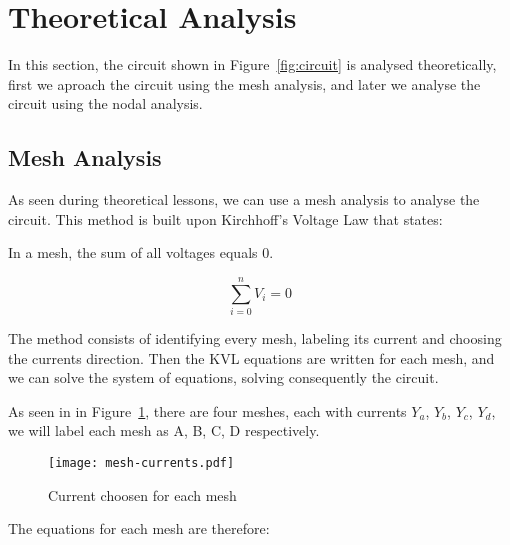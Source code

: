\section{Theoretical Analysis}
\label{sec:analysis}

In this section, the circuit shown in Figure~\ref{fig:circuit} is analysed
theoretically, first we aproach the circuit using the mesh analysis, and later we analyse the circuit using the nodal analysis.

\subsection{Mesh Analysis}

As seen during theoretical lessons, we can use a mesh analysis to analyse the circuit.
This method is built upon Kirchhoff's Voltage Law that states:

In a mesh, the sum of all voltages equals 0.

\begin{equation}
  \sum_{i=0}^{n} V_i = 0
  \label{eq:kvl}
\end{equation}

The method consists of identifying every mesh, labeling its current and choosing the currents direction.
Then the KVL equations are written for each mesh, and we can solve the system of equations, solving consequently the circuit.

As seen in in Figure~\ref{fig:mesh}, there are four meshes, each with currents $Y_a$, $Y_b$, $Y_c$, $Y_d$, 
we will label each mesh as A, B, C, D respectively.

\begin{figure}[H] \centering
  \texttt{[image: mesh-currents.pdf]}
  \caption{Current choosen for each mesh}
  \label{fig:mesh}
\end{figure}

The equations for each mesh are therefore:

